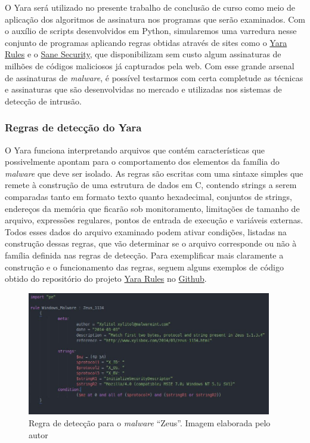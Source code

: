 O Yara será utilizado no presente trabalho de conclusão de curso como meio de
aplicação dos algoritmos de assinatura nos programas que serão examinados. Com
o auxílio de scripts desenvolvidos em Python, simularemos uma varredura nesse
conjunto de programas aplicando regras obtidas através de sites como o
\href{yararules.org}{Yara Rules} e o
\href{http://sanesecurity.com/usage/signatures/}{Sane Security}, que
disponibilizam sem custo algum assinaturas de milhões de códigos maliciosos já
capturados pela web. Com esse grande arsenal de assinaturas de \textit{malware}, é
possível testarmos com certa completude as técnicas e assinaturas que são
desenvolvidas no mercado e utilizadas nos sistemas de detecção de intrusão.

\subsubsection{Regras de detecção do Yara} 
\label{l.regrasdyara}
O Yara funciona interpretando arquivos que contém características que possivelmente
apontam para o comportamento dos elementos da família do \textit{malware} que deve ser
isolado. As regras são escritas com uma sintaxe simples que remete à
construção de uma estrutura de dados em C, contendo strings a serem comparadas
tanto em formato texto quanto hexadecimal, conjuntos de strings, endereços da
memória que ficarão sob monitoramento, limitações de tamanho de arquivo,
expressões regulares, pontos de entrada de execução e variáveis externas.
Todos esses dados do arquivo examinado podem ativar condições, listadas na
construção dessas regras, que vão determinar se o arquivo corresponde ou não à
família definida nas regras de detecção. Para exemplificar mais claramente a
construção e o funcionamento das regras, seguem alguns exemplos de código
obtido do repositório do projeto \href{yararules.org}{Yara Rules} no
\href{github.com}{Github}.

\begin{figure}[h]
	\centering
	\includegraphics[width=0.95\textwidth]{figs/zeus}
	\caption{Regra de detecção para o \textit{malware} ``Zeus''. Imagem elaborada pelo autor}
	\label{fig:label}
\end{figure}

